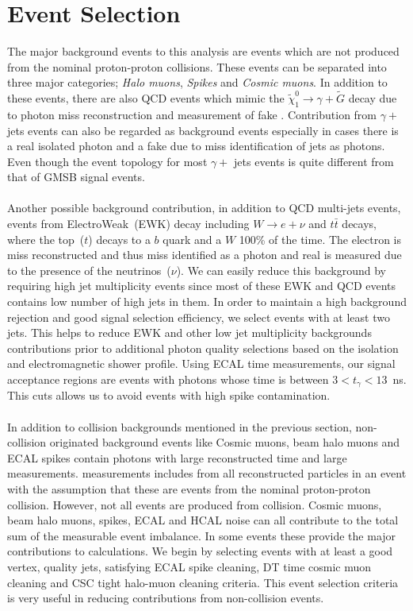 \section{Event Selection}
The major background events to this analysis are events which are not produced from the nominal proton-proton collisions. These events can be separated into three major categories; \textit{Halo muons}, \textit{Spikes} and \textit{Cosmic muons}.  In addition to these events, there are also QCD events which mimic the $\tilde{\chi}^{0}_{1} \rightarrow \gamma + \tilde{G}$ decay due to photon miss reconstruction and measurement of fake \MET . Contribution from $\gamma + $ jets events can also be regarded as background events especially in cases there is a real isolated photon and a fake \MET  due to miss identification of jets as photons. Even though the event topology for most $\gamma +$ jets events is quite different from that of GMSB signal events. 
\paragraph*{}
Another possible background contribution, in addition to QCD multi-jets events, events from ElectroWeak~(EWK) decay including $W \rightarrow e + \nu$ and $t\bar{t}$ decays, where the top~($t$) decays to a $b$ quark and a $W$ 100\% of the time. The electron is miss reconstructed and thus miss identified as a photon and real \MET is measured due to the presence of the neutrinos~($\nu$). We can easily reduce this background by requiring high jet  multiplicity events since most of these EWK and QCD events contains low number of high \pt jets in them. In order to maintain a high background rejection and good signal selection efficiency, we select  events with at least two jets. This helps to reduce EWK and other low jet multiplicity backgrounds contributions prior to additional photon quality selections based on the isolation and electromagnetic shower profile.  Using ECAL time measurements, our signal acceptance regions are events with photons whose time is between $3 < t_{\gamma} < 13$~ns. This cuts allows us to avoid events with high spike contamination.
\paragraph*{}
In addition to collision backgrounds mentioned in the previous section, non-collision originated background events like Cosmic muons, beam halo muons and ECAL spikes  contain photons with large reconstructed time and large \MET measurements. \MET measurements includes \pt from all reconstructed particles in an event with the assumption that  these are events from the nominal proton-proton collision. However, not all events are produced from collision. Cosmic muons, beam halo muons, spikes, ECAL and HCAL noise can all contribute to the total sum of the measurable event \pt imbalance. In some events these provide the major contributions to \MET calculations. 
We begin by selecting events with at least a good vertex, quality jets, satisfying ECAL spike cleaning, DT time cosmic muon cleaning and CSC tight halo-muon cleaning criteria. This event selection criteria is very useful in reducing contributions from non-collision events.

